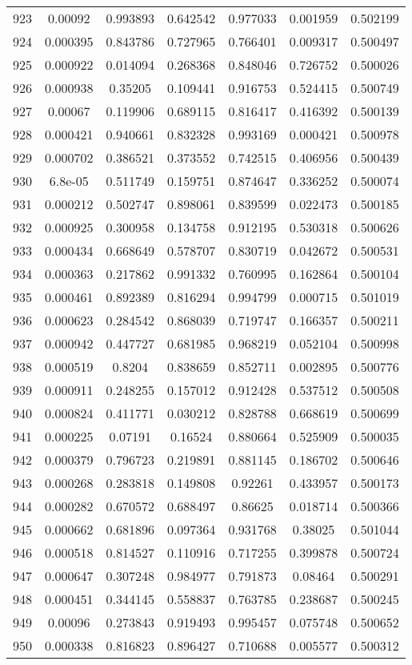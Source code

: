 \begin{table}
\begin{tabular}{c|c|c|c|c|c|c}
923 & 0.00092 & 0.993893 & 0.642542 & 0.977033 & 0.001959 & 0.502199\\
924 & 0.000395 & 0.843786 & 0.727965 & 0.766401 & 0.009317 & 0.500497\\
925 & 0.000922 & 0.014094 & 0.268368 & 0.848046 & 0.726752 & 0.500026\\
926 & 0.000938 & 0.35205 & 0.109441 & 0.916753 & 0.524415 & 0.500749\\
927 & 0.00067 & 0.119906 & 0.689115 & 0.816417 & 0.416392 & 0.500139\\
928 & 0.000421 & 0.940661 & 0.832328 & 0.993169 & 0.000421 & 0.500978\\
929 & 0.000702 & 0.386521 & 0.373552 & 0.742515 & 0.406956 & 0.500439\\
930 & 6.8e-05 & 0.511749 & 0.159751 & 0.874647 & 0.336252 & 0.500074\\
931 & 0.000212 & 0.502747 & 0.898061 & 0.839599 & 0.022473 & 0.500185\\
932 & 0.000925 & 0.300958 & 0.134758 & 0.912195 & 0.530318 & 0.500626\\
933 & 0.000434 & 0.668649 & 0.578707 & 0.830719 & 0.042672 & 0.500531\\
934 & 0.000363 & 0.217862 & 0.991332 & 0.760995 & 0.162864 & 0.500104\\
935 & 0.000461 & 0.892389 & 0.816294 & 0.994799 & 0.000715 & 0.501019\\
936 & 0.000623 & 0.284542 & 0.868039 & 0.719747 & 0.166357 & 0.500211\\
937 & 0.000942 & 0.447727 & 0.681985 & 0.968219 & 0.052104 & 0.500998\\
938 & 0.000519 & 0.8204 & 0.838659 & 0.852711 & 0.002895 & 0.500776\\
939 & 0.000911 & 0.248255 & 0.157012 & 0.912428 & 0.537512 & 0.500508\\
940 & 0.000824 & 0.411771 & 0.030212 & 0.828788 & 0.668619 & 0.500699\\
941 & 0.000225 & 0.07191 & 0.16524 & 0.880664 & 0.525909 & 0.500035\\
942 & 0.000379 & 0.796723 & 0.219891 & 0.881145 & 0.186702 & 0.500646\\
943 & 0.000268 & 0.283818 & 0.149808 & 0.92261 & 0.433957 & 0.500173\\
944 & 0.000282 & 0.670572 & 0.688497 & 0.86625 & 0.018714 & 0.500366\\
945 & 0.000662 & 0.681896 & 0.097364 & 0.931768 & 0.38025 & 0.501044\\
946 & 0.000518 & 0.814527 & 0.110916 & 0.717255 & 0.399878 & 0.500724\\
947 & 0.000647 & 0.307248 & 0.984977 & 0.791873 & 0.08464 & 0.500291\\
948 & 0.000451 & 0.344145 & 0.558837 & 0.763785 & 0.238687 & 0.500245\\
949 & 0.00096 & 0.273843 & 0.919493 & 0.995457 & 0.075748 & 0.500652\\
950 & 0.000338 & 0.816823 & 0.896427 & 0.710688 & 0.005577 & 0.500312\\
\end{tabular}
\end{table}
